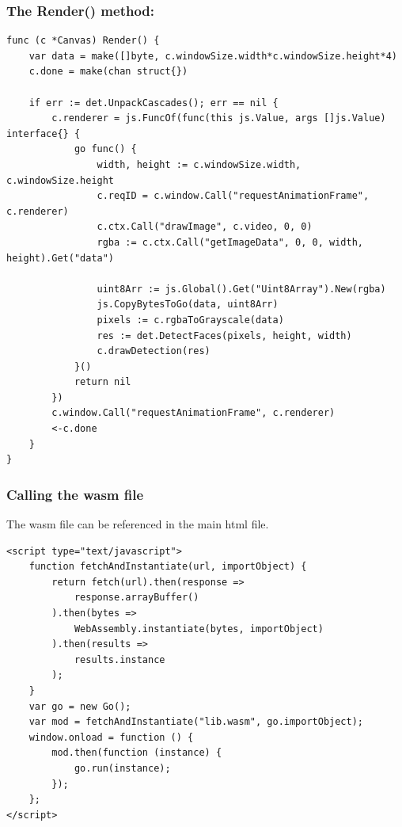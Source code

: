 \documentclass[9pt]{beamer}
\begin{document}
\begin{frame}[fragile]
\frametitle{The Render() method:}



\begin{verbatim}
func (c *Canvas) Render() {
    var data = make([]byte, c.windowSize.width*c.windowSize.height*4)
    c.done = make(chan struct{})

    if err := det.UnpackCascades(); err == nil {
        c.renderer = js.FuncOf(func(this js.Value, args []js.Value) interface{} {
            go func() {
                width, height := c.windowSize.width, c.windowSize.height
                c.reqID = c.window.Call("requestAnimationFrame", c.renderer)
                c.ctx.Call("drawImage", c.video, 0, 0)
                rgba := c.ctx.Call("getImageData", 0, 0, width, height).Get("data")

                uint8Arr := js.Global().Get("Uint8Array").New(rgba)
                js.CopyBytesToGo(data, uint8Arr)
                pixels := c.rgbaToGrayscale(data)
                res := det.DetectFaces(pixels, height, width)
                c.drawDetection(res)
            }()
            return nil
        })
        c.window.Call("requestAnimationFrame", c.renderer)
        <-c.done
    }
}

\end{verbatim}



\end{frame}

\begin{frame}[fragile]
\frametitle{Calling the wasm file}


The wasm file can be referenced in the main html file.



\begin{verbatim}
<script type="text/javascript">
    function fetchAndInstantiate(url, importObject) {
        return fetch(url).then(response =>
            response.arrayBuffer()
        ).then(bytes =>
            WebAssembly.instantiate(bytes, importObject)
        ).then(results =>
            results.instance
        );
    }
    var go = new Go();
    var mod = fetchAndInstantiate("lib.wasm", go.importObject);
    window.onload = function () {
        mod.then(function (instance) {
            go.run(instance);
        });
    };
</script>

\end{verbatim}



\end{frame}
\end{document}

